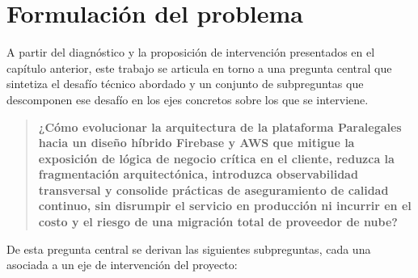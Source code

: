 \section{Formulación del problema}

A partir del diagnóstico y la proposición de intervención presentados en el capítulo anterior, este trabajo se articula en torno a una pregunta central que sintetiza el desafío técnico abordado y un conjunto de subpreguntas que descomponen ese desafío en los ejes concretos sobre los que se interviene.

\begin{quote}
  \textbf{¿Cómo evolucionar la arquitectura de la plataforma Paralegales hacia un diseño híbrido Firebase y AWS que mitigue la exposición de lógica de negocio crítica en el cliente, reduzca la fragmentación arquitectónica, introduzca observabilidad transversal y consolide prácticas de aseguramiento de calidad continuo, sin disrumpir el servicio en producción ni incurrir en el costo y el riesgo de una migración total de proveedor de nube?}
\end{quote}

De esta pregunta central se derivan las siguientes subpreguntas, cada una asociada a un eje de intervención del proyecto:

